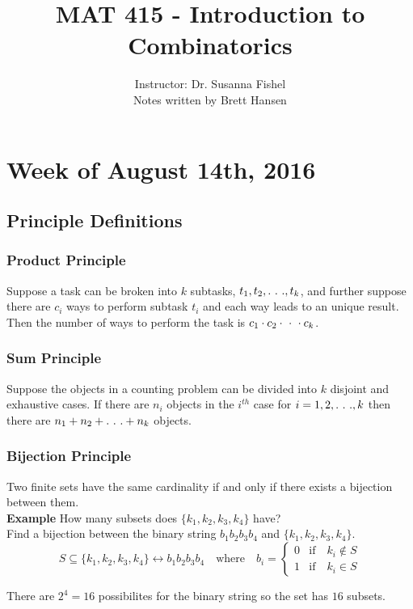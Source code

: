 \documentclass{article}
\title{MAT 415 - Introduction to Combinatorics}
\author{
{\large Instructor: Dr. Susanna Fishel} \\
		Notes written by Brett Hansen
}
\date{}
\begin{document}
\maketitle
\tableofcontents
\break

\section{Week of August 14th, 2016}
\subsection{Principle Definitions}
\subsubsection{Product Principle}
Suppose a task can be broken into $k$ subtasks, $t_1,t_2,.\ .\ .,t_k$, and further suppose there are $c_i$ ways to perform subtask $t_i$ and each way leads to an unique result. Then the number of ways to perform the task is $c_1 \cdot c_2 \cdot\ \cdot\ \cdot c_k$.

\subsubsection{Sum Principle}
Suppose the objects in a counting problem can be divided into $k$ disjoint and exhaustive cases. If there are $n_i$ objects in the $i^{th}$ case for $i=1,2,.\ .\ .,k$ then there are $n_1+n_2+.\ .\ .+n_k$ objects.

\subsubsection{Bijection Principle}
Two finite sets have the same cardinality if and only if there exists a bijection between them. \\
\newline
\textbf{Example} \quad How many subsets does $\{k_1,k_2,k_3,k_4\}$ have? \\
Find a bijection between the binary string $b_1b_2b_3b_4$ and $\{k_1,k_2,k_3,k_4\}$. \\

$$S\subseteq\{k_1,k_2,k_3,k_4\}\longleftrightarrow b_1b_2b_3b_4 \quad\text{where}\quad b_i=
\begin{cases} 
	0 & \text{if}\quad k_i \notin S\\
	1 & \text{if}\quad k_i \in S
\end{cases}
$$

\noindent There are $2^4=16$ possibilites for the binary string so the set has $16$ subsets.
\end{document}
